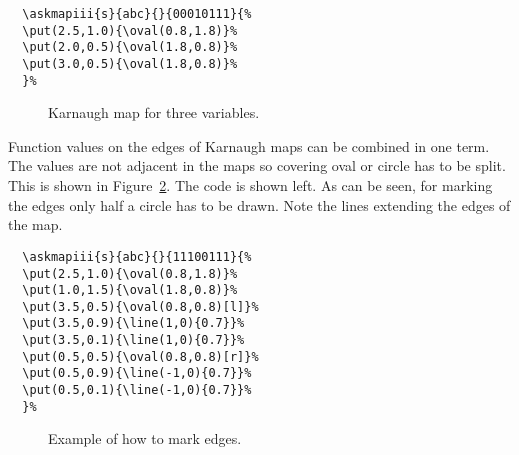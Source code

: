 \documentclass[a4paper,10pt]{ltxdoc}
\begin{document}
\begin{minipage}[c]{0.5\textwidth}
\begin{verbatim}
  \askmapiii{s}{abc}{}{00010111}{%
  \put(2.5,1.0){\oval(0.8,1.8)}%
  \put(2.0,0.5){\oval(1.8,0.8)}%
  \put(3.0,0.5){\oval(1.8,0.8)}%
  }%
\end{verbatim}
\end{minipage}\hfill%
\begin{minipage}[c]{0.5\textwidth}
\begin{figure}[H]
\centering
\askmapunitlength=0.88cm
%
\caption{Karnaugh map for three variables.}
\label{fig:kmapsthree}
\end{figure}
\end{minipage}
\bigskip

Function values on the edges of Karnaugh maps can be combined in one term.
The values are not adjacent in the maps so covering oval or circle has to be
split. This is shown in Figure~\ref{fig:kmapsthreemarkedges}. The code is
shown left. As can be seen, for marking the edges only half a circle has to
be drawn. Note the lines extending the edges of the map.


\bigskip
\begin{minipage}[c]{0.5\textwidth}
\begin{verbatim}
  \askmapiii{s}{abc}{}{11100111}{%
  \put(2.5,1.0){\oval(0.8,1.8)}%
  \put(1.0,1.5){\oval(1.8,0.8)}%
  \put(3.5,0.5){\oval(0.8,0.8)[l]}%
  \put(3.5,0.9){\line(1,0){0.7}}%
  \put(3.5,0.1){\line(1,0){0.7}}%
  \put(0.5,0.5){\oval(0.8,0.8)[r]}%
  \put(0.5,0.9){\line(-1,0){0.7}}%
  \put(0.5,0.1){\line(-1,0){0.7}}%
  }%
\end{verbatim}
\end{minipage}\hfill%
\begin{minipage}[c]{0.5\textwidth}
\vspace*{-3\baselineskip}
\begin{figure}[H]
\centering
{}%
\caption{Example of how to mark edges.}
\label{fig:kmapsthreemarkedges}
\end{figure}
\end{minipage}
\bigskip
\end{document}
